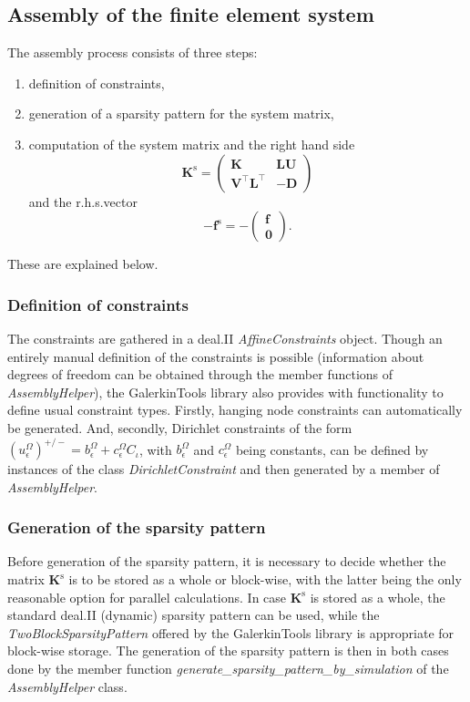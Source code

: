 \documentclass[pdftex,a4paper,12pt,abstracton]{scrartcl}
\begin{document}
\subsection{Assembly of the finite element system}
The assembly process consists of three steps:
\begin{enumerate}
 \item definition of constraints,
 \item generation of a sparsity pattern for the system matrix,
 \item computation of the system matrix and the right hand side
  \begin{equation}
   \boldsymbol{K^\mathrm{s}} =
   \begin{pmatrix}
   \boldsymbol{K} & \boldsymbol{L} \boldsymbol{U} \\
   \boldsymbol{V}^\top \boldsymbol{L}^\top & -\boldsymbol{D}
   \end{pmatrix}
  \end{equation}
 and the r.h.s.\@ vector
  \begin{equation}
    -\boldsymbol{f^\mathrm{s}} =
    -\begin{pmatrix}
    \boldsymbol{f} \\
    \boldsymbol{0}
    \end{pmatrix}.
  \end{equation}
\end{enumerate}
These are explained below.

\subsubsection{Definition of constraints}
The constraints are gathered in a deal.II \textit{AffineConstraints} object. Though an entirely manual definition of the constraints is possible (information about degrees of freedom can be obtained through the member functions of \textit{AssemblyHelper}), the GalerkinTools library also provides with functionality to define usual constraint types. Firstly, hanging node constraints can automatically be generated. And, secondly, Dirichlet constraints of the form $(u^\Omega_\epsilon)^{+/-} = b^\Omega_\epsilon + c^\Omega_\epsilon C_\iota$, with $b^\Omega_\epsilon$ and $c^\Omega_\epsilon$ being constants, can be defined by instances of the class \textit{DirichletConstraint} and then generated by a member of \textit{AssemblyHelper}.

\subsubsection{Generation of the sparsity pattern}
Before generation of the sparsity pattern, it is necessary to decide whether the matrix $\boldsymbol{K^\mathrm{s}}$ is to be stored as a whole or block-wise, with the latter being the only reasonable option for parallel calculations. In case $\boldsymbol{K^\mathrm{s}}$ is stored as a whole, the standard deal.II (dynamic) sparsity pattern can be used, while the \textit{TwoBlockSparsityPattern} offered by the GalerkinTools library is appropriate for block-wise storage. The generation of the sparsity pattern is then in both cases done by the member function \textit{generate\_sparsity\_pattern\_by\_simulation} of the \textit{AssemblyHelper} class.
\end{document}
